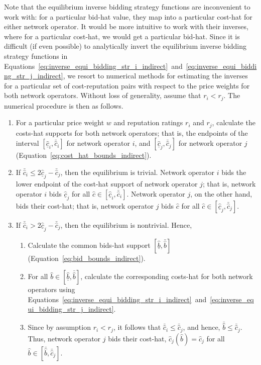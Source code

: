 Note that the equilibrium inverse bidding strategy functions are inconvenient to work with: for a particular bid-hat value, they map into a particular cost-hat for either network operator. It would be more intuitive to work with their inverses, where for a particular cost-hat, we would get a particular bid-hat. Since it is difficult (if even possible) to analytically invert the equilibrium inverse bidding strategy functions in Equations~\eqref{eq:inverse_equi_bidding_str_i_indirect}~and~\eqref{eq:inverse_equi_bidding_str_j_indirect}, we resort to numerical methods for estimating the inverses for a particular set of cost-reputation pairs with respect to the price weights for both network operators. Without loss of generality, assume that $r_i < r_j$. The numerical procedure is then as follows.
\begin{enumerate}
  \item For a particular price weight $w$ and reputation ratings $r_i$ and $r_j$, calculate the costs-hat supports for both network operators; that is, the endpoints of the interval $[\underline{\hat{c}}_i, \bar{\hat{c}}_i]$ for network operator $i$, and $[\underline{\hat{c}}_j, \bar{\hat{c}}_j]$ for network operator $j$ (Equation~\eqref{eq:cost_hat_bounds_indirect}).
  \item If $\bar{\hat{c}}_i \le 2\underline{\hat{c}}_j - \bar{\hat{c}}_j$, then the equilibrium is trivial. Network operator $i$ bids the lower endpoint of the cost-hat support of network operator $j$; that is, network operator $i$ bids $\underline{\hat{c}}_j$ for all $\hat{c}\in [\underline{\hat{c}}_i, \bar{\hat{c}}_i]$. Network operator $j$, on the other hand, bids their cost-hat; that is, network operator $j$ bids $\hat{c}$ for all $\hat{c}\in [\underline{\hat{c}}_j, \bar{\hat{c}}_j]$.
  \item If $\bar{\hat{c}}_i > 2\underline{\hat{c}}_j - \bar{\hat{c}}_j$, then the equilibrium is nontrivial. Hence,
  \begin{enumerate}
    \item Calculate the common bids-hat support $[\underline{\hat{b}}, \bar{\hat{b}}]$ (Equation~\eqref{eq:bid_bounds_indirect}).
    \item For all $\hat{b}\in [\underline{\hat{b}}, \bar{\hat{b}}]$, calculate the corresponding costs-hat for both network operators using Equations~\eqref{eq:inverse_equi_bidding_str_i_indirect}~and~\eqref{eq:inverse_equi_bidding_str_j_indirect}.
    \item Since by assumption $r_i < r_j$, it follows that $\bar{\hat{c}}_i \le \bar{\hat{c}}_j$, and hence, $\bar{\hat{b}}\le \bar{\hat{c}}_j$. Thus, network operator $j$ bids their cost-hat, $\hat{c}_j(\hat{b}) = \hat{c}_j$  for all $\hat{b}\in [\bar{\hat{b}}, \bar{\hat{c}}_j]$.
  \end{enumerate}
\end{enumerate}

